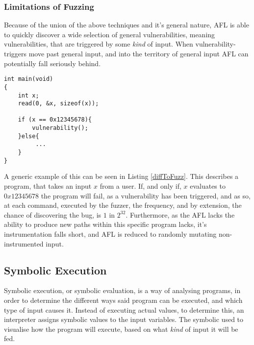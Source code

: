 \documentclass[a4paper]{article}
\newcommand{\tit}[1]{\textit{#1}}
\begin{document}
\subsubsection*{Limitations of Fuzzing}
Because of the union of the above techniques and it's general nature, AFL is able to quickly discover a wide selection of general vulnerabilities, meaning vulnerabilities, that are triggered by some \tit{kind} of input. When vulnerability-triggers move past general input, and into the territory of general input AFL can potentially fall seriously behind.
\begin{lstlisting}[caption=A program that is difficult to fuzz, label=diffToFuzz, captionpos=b]
int main(void)
{
    int x;
    read(0, &x, sizeof(x));
    
    if (x == 0x12345678){
        vulnerability();
    }else{
         ...
    }
}
\end{lstlisting}
A generic example of this can be seen in Listing \ref{diffToFuzz}. This describes a program, that takes an input $x$ from a user. If, and only if, $x$ evaluates to $0x12345678$ the program will fail, as a vulnerability has been triggered, and as so, at each command, executed by the fuzzer, the frequency, and by extension, the chance of discovering the bug, is $1$ in $2^{32}$. Furthermore, as the AFL lacks the ability to produce new paths within this specific program lacks, it's instrumentation falls short, and AFL is reduced to randomly mutating non-instrumented input.
\subsection{Symbolic Execution}
Symbolic execution, or symbolic evaluation, is a way of analysing programs, in order to determine the different ways said program can be executed, and which type of input causes it. Instead of executing actual values, to determine this, an interpreter assigns symbolic values to the input variables. The symbolic used to visualise how the program will execute, based on what \tit{kind} of input it will be fed.
\end{document}
